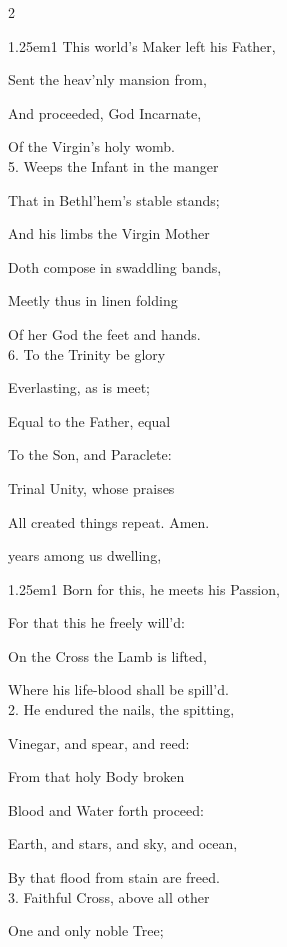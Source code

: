 \begin{paracol}{2}
\begin{hangparas}{1.25em}{1}
This world's Maker left his Father,

Sent the heav'nly mansion from,

And proceeded, God Incarnate,

Of the Virgin's holy womb.\\

5. Weeps the Infant in the manger

That in Bethl'hem's stable stands;

And his limbs the Virgin Mother

Doth compose in swaddling bands,

Meetly thus in linen folding

Of her God the feet and hands.\\

6. To the Trinity be glory

Everlasting, as is meet;

Equal to the Father, equal

To the Son, and Paraclete:

Trinal Unity, whose praises

All created things repeat. Amen.
\end{hangparas}

\vspace{-1\baselineskip}

\mattinsOfficeHymn
{} years among us dwelling,


\begin{hangparas}{1.25em}{1}
Born for this, he meets his Passion,

For that this he freely will'd:

On the Cross the Lamb is lifted,

Where his life-blood shall be spill'd.\\

2. He endured the nails, the spitting,

Vinegar, and spear, and reed:

From that holy Body broken

Blood and Water forth proceed:

Earth, and stars, and sky, and ocean,

By that flood from stain are freed.\\

3. Faithful Cross, above all other

One and only noble Tree;


\end{hangparas}
\end{paracol}
